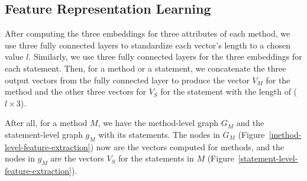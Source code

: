 \subsection{Feature Representation Learning}

After computing the three embeddings for three attributes of each
method, we use three fully connected layers to standardize each
vector's length to a chosen value $l$.
Similarly, we use three fully connected layers for the three
embeddings for each statement. Then, for a method or a statement, we
concatenate the three output vectors from the fully connected layer to
produce the vector $V_{M}$ for the method and the other three vectors
for $V_{S}$ for the statement with the length of ($l \times 3$).


After all, for a method $M$, we have the method-level graph $G_{M}$
and the statement-level graph $g_{M}$ with its statements. The nodes
in $G_M$ (Figure~\ref{method-level-feature-extraction}) now are the
vectors computed for methods, and the nodes in $g_M$ are the vectors
$V_S$ for the statements in $M$
(Figure~\ref{statement-level-feature-extraction}).






